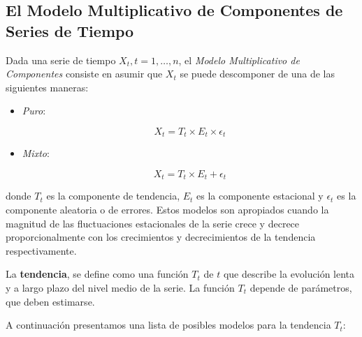\documentclass[12pt,]{krantz}
\providecommand{\tightlist}{%
  \setlength{\itemsep}{0pt}\setlength{\parskip}{0pt}}
\theoremstyle{definition}
\theoremstyle{definition}
\theoremstyle{definition}
\theoremstyle{remark}
\let\BeginKnitrBlock\begin \let\EndKnitrBlock\end
\begin{document}
\subsection{El Modelo Multiplicativo de Componentes de Series de
Tiempo}\label{el-modelo-multiplicativo-de-componentes-de-series-de-tiempo}

Dada una serie de tiempo \(X_t,t=1,\ldots,n\), el \emph{Modelo
Multiplicativo de Componentes} consiste en asumir que \(X_t\) se puede
descomponer de una de las siguientes maneras:

\begin{itemize}
\tightlist
\item
  \emph{Puro}:

  \begin{equation}
  X_t = T_t\times E_t\times\epsilon_t
  \label{eq:eq-modelo-multiplicativo-puro}
  \end{equation}
\item
  \emph{Mixto}:

  \begin{equation}
  X_t = T_t\times E_t+\epsilon_t
  \label{eq:eq-modelo-multiplicativo-mixto}
  \end{equation}
\end{itemize}

donde \(T_t\) es la componente de tendencia, \(E_t\) es la componente
estacional y \(\epsilon_t\) es la componente aleatoria o de errores.
Estos modelos son apropiados cuando la magnitud de las fluctuaciones
estacionales de la serie crece y decrece proporcionalmente con los
crecimientos y decrecimientos de la tendencia respectivamente.

\BeginKnitrBlock{definition}
\protect\hypertarget{def:defi-tendencia}{}{\label{def:defi-tendencia} }La
\textbf{tendencia}, se define como una función \(T_t\) de \(t\) que
describe la evolución lenta y a largo plazo del nivel medio de la serie.
La función \(T_t\) depende de parámetros, que deben estimarse.
\EndKnitrBlock{definition}

A continuación presentamos una lista de posibles modelos para la
tendencia \(T_t\):
\end{document}
